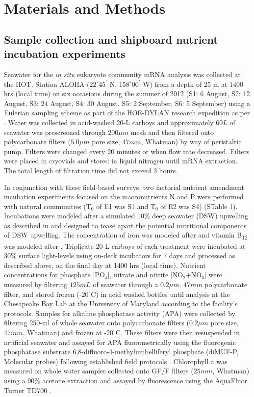 \section{Materials and Methods}

\subsection{Sample collection and shipboard nutrient incubation experiments}
Seawater for the \textit{in situ} eukaryote community mRNA analysis was collected at the HOT, Station ALOHA ($22^\circ 45^\prime$ N, $158^\circ 00^\prime$ W) from a depth of 25 m at 1400 hrs (local time) on six occasions during the summer of 2012 (S1: 6 August, S2: 12 August, S3: 24 August, S4: 30 August, S5: 2 September, S6: 5 September) using a Eulerian sampling scheme as part of the HOE-DYLAN research expedition as per \citet{Alexander2015a}. Water was collected in acid-washed 20-L carboys and approximately $60 L$ of seawater was prescreened through $200 \mu m$ mesh and then filtered onto polycarbonate filters ($5.0 \mu m$ pore size, $47 mm$, Whatman) by way of peristaltic pump. Filters were changed every 20 minutes or when flow rate decreased. Filters were placed in cryovials and stored in liquid nitrogen until mRNA extraction. The total length of filtration time did not exceed 3 hours. \par

In conjunction with these field-based surveys, two factorial nutrient amendment incubation experiments focused on the macronutrients N and P were performed with natural communities (T$_0$ of E1 was S1 and T$_0$ of E2 was S4) (STable 1). Incubations were modeled after a simulated 10\% deep seawater (DSW) upwelling as described in \citet{Alexander2015a} and designed to tease apart the potential nutritional components of DSW upwelling. The concentration of iron was modeled after \citet{Marchetti2012a} and vitamin B\textsubscript{12} was modeled after \citet{Bertrand2007}. Triplicate 20-L carboys of each treatment were incubated at 30\% surface light-levels using on-deck incubators for 7 days and processed as described above, on the final day at 1400 hrs (local time). Nutrient concentrations for phosphate [PO$_{4}$], nitrate and nitrite [NO$_2$+NO$_3$] were measured by filtering $125 mL$ of seawater through a $0.2 \mu m$, $47 mm$ polycarbonate filter, and stored frozen (-$20^\circ$C) in acid washed bottles until analysis at the Chesapeake Bay Lab at the University of Maryland according to the facility's protocols. Samples for alkaline phosphatase activity (APA) were collected by filtering 250-ml of whole seawater onto polycarbonate filters ($0.2 \mu m$ pore size, $47 mm$, Whatman) and frozen at -$20^\circ$C. These filters were then resuspended in artificial seawater and assayed for APA fluorometrically using the fluorogenic phosphatase substrate 6,8-difluoro-4-methylumbelliferyl phosphate (diMUF-P, Molecular probes) following established field protocols \citep{Dyhrman2006}. Chlorophyll a was measured on whole water samples collected onto GF/F filters ($25 mm$, Whatman) using a 90\% acetone extraction and assayed by fluorescence using the AquaFluor Turner TD700 \citep{Parsons1984}.\par

